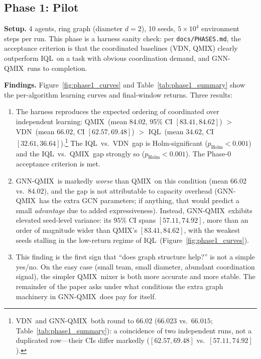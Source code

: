 \documentclass[10pt]{article}
\newcommand{\algoname}[1]{\textsc{#1}}
\newcommand{\iql}{\algoname{IQL}}
\newcommand{\vdn}{\algoname{VDN}}
\newcommand{\qmix}{\algoname{QMIX}}
\newcommand{\gnnqmix}{\algoname{GNN-QMIX}}
\begin{document}
\subsection{Phase 1: Pilot}
\label{sec:results:pilot}

\textbf{Setup.} 4 agents, ring graph (diameter $d=2$), 10 seeds, $5 \times 10^4$
environment steps per run. This phase is a harness sanity check: per
\texttt{docs/PHASES.md}, the acceptance criterion is that the coordinated
baselines (\vdn, \qmix) clearly outperform \iql\ on a task with obvious
coordination demand, and \gnnqmix\ runs to completion.

\textbf{Findings.} Figure~\ref{fig:phase1_curves} and
Table~\ref{tab:phase1_summary} show the per-algorithm learning curves and
final-window returns. Three results:
\begin{enumerate}[leftmargin=*,itemsep=0pt,topsep=2pt]
  \item The harness reproduces the expected ordering of coordinated over
        independent learning: \qmix\ (mean $84.02$, 95\% CI
        $[83.41, 84.62]$) $>$ \vdn\ (mean $66.02$, CI $[62.57, 69.48]$) $>$
        \iql\ (mean $34.62$, CI $[32.61, 36.64]$).\footnote{\vdn\ and \gnnqmix\
        both round to $66.02$ ($66.023$ vs.\ $66.015$;
        Table~\ref{tab:phase1_summary}): a coincidence of two independent runs,
        not a duplicated row---their CIs differ markedly ($[62.57, 69.48]$
        vs.\ $[57.11, 74.92]$).} The \iql\ vs.\ \vdn\ gap
        is Holm-significant ($p_{\text{Holm}} < 0.001$) and the \iql\
        vs.\ \qmix\ gap strongly so ($p_{\text{Holm}} < 0.001$). The
        Phase-0 acceptance criterion is met.
  \item \gnnqmix\ is markedly \emph{worse} than \qmix\ on this condition
        (mean $66.02$ vs.\ $84.02$), and the gap is not attributable to
        capacity overhead (\gnnqmix\ has the extra GCN parameters; if
        anything, that would predict a small \emph{advantage} due to
        added expressiveness). Instead, \gnnqmix\ exhibits elevated
        seed-level variance: its $95\%$ CI spans $[57.11, 74.92]$, more than
        an order of magnitude wider than \qmix's $[83.41, 84.62]$, with the
        weakest seeds stalling in the low-return regime of \iql\
        (Figure~\ref{fig:phase1_curves}).
  \item This finding is the first sign that ``does graph structure
        help?'' is not a simple yes/no. On the easy case (small team,
        small diameter, abundant coordination signal), the simpler
        \qmix\ mixer is both more accurate and more stable. The
        remainder of the paper asks under what conditions the extra
        graph machinery in \gnnqmix\ does pay for itself.
\end{enumerate}
\end{document}
